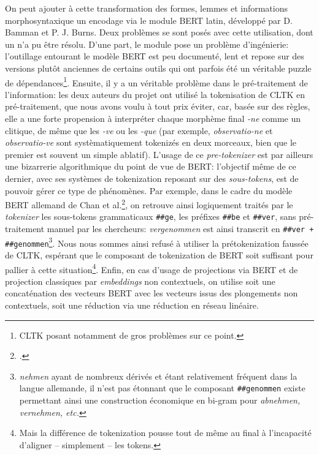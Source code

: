 On peut ajouter à cette transformation des formes, lemmes et informations morphosyntaxique un encodage via le module BERT latin, développé par D. Bamman et P. J. Burns. Deux problèmes se sont posés avec cette utilisation, dont un n'a pu être résolu. D'une part, le module pose un problème d'ingénierie: l'outillage entourant le modèle BERT est peu documenté, lent et repose sur des versions plutôt anciennes de certains outils qui ont parfois été un véritable puzzle de dépendances\footnote{CLTK posant notamment de gros problèmes sur ce point.}. Ensuite, il y a un véritable problème dans le pré-traitement de l'information: les deux auteurs du projet ont utilisé la tokenisation de CLTK en pré-traitement, que nous avons voulu à tout prix éviter, car, basée sur des règles, elle a une forte propension à interpréter chaque morphème final \textit{-ne} comme un clitique, de même que les \textit{-ve} ou les \textit{-que} (par exemple, \textit{observatio-ne} et \textit{observatio-ve} sont systèmatiquement tokenizés en deux morceaux, bien que le premier est souvent un simple ablatif). L'usage de ce \textit{pre-tokenizer} est par ailleurs une bizarrerie algorithmique du point de vue de BERT: l'objectif même de ce dernier, avec ses systèmes de tokenization reposant sur des \textit{sous-tokens}, est de pouvoir gérer ce type de phénomènes. Par exemple, dans le cadre du modèle BERT allemand de Chan et al.\footcite{chan_german_2019}, on retrouve ainsi logiquement traités par le \textit{tokenizer} les sous-tokens grammaticaux \texttt{\#\#ge}, les préfixes \texttt{\#\#be} et \texttt{\#\#ver}, sans pré-traitement manuel par les chercheurs: \textit{vergenommen} est ainsi transcrit en \texttt{\#\#ver + \#\#genommen}\footnote{\textit{nehmen} ayant de nombreux dérivés et étant relativement fréquent dans la langue allemande, il n'est pas étonnant que le composant \texttt{\#\#genommen} existe permettant ainsi une construction économique en bi-gram pour \textit{abnehmen, vernehmen, etc.}}. Nous nous sommes ainsi refusé à utiliser la prétokenization faussée de CLTK, espérant que le composant de tokenization de BERT soit suffisant pour pallier à cette situation\footnote{Mais la différence de tokenization pousse tout de même au final à l'incapacité d'aligner -- simplement -- les tokens.}. Enfin, en cas d'usage de projections via BERT et de projection classiques par \textit{embeddings} non contextuels, on utilise soit une concaténation des vecteurs BERT avec les vecteurs issus des plongements non contextuels, soit une réduction via une réduction en réseau linéaire.

